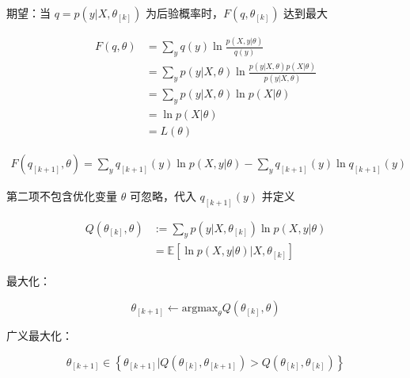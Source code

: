 \documentclass[openany,a4paper,12pt]{ctexbook}
\theoremstyle{kaiti}
\theoremstyle{normal}
\begin{document}
期望：当 $q=p\left(y|X,\theta_{\left[k \right]} \right)$ 为后验概率时，$F\left(q,\theta_{\left[k \right]} \right)$ 达到最大

\begin{equation}
\begin{aligned}
  F\left(q,\theta \right)
  &=\sum_yq(y)\ln\frac{p\left(X,y|\theta \right)}{q(y)}\\
  &=\sum_yp\left(y|X,\theta \right)\ln\frac{p\left(y|X,\theta \right)p(X|\theta)}{p\left(y|X,\theta \right)} \\
  &=\sum_yp\left(y|X,\theta \right)\ln p(X|\theta)\\
  &=\ln p(X|\theta)\\
  &=L(\theta)
\end{aligned}
\end{equation}

\begin{equation}
\begin{aligned}
  F\left(q_{\left[k+1 \right]},\theta \right)=\sum_yq_{\left[k+1 \right]}(y)\ln p\left(X,y|\theta \right)-\sum_yq_{\left[k+1 \right]}(y)\ln q_{\left[k+1 \right]}(y)
\end{aligned}
\end{equation}

第二项不包含优化变量 $\theta$ 可忽略，代入 $q_{\left[k+1 \right]}(y)$ 并定义

\begin{equation}
\begin{aligned}
  Q\left(\theta_{\left[k \right]},\theta \right)&:=\sum_yp\left(y|X,\theta_{\left[k \right]} \right)\ln p\left(X,y|\theta \right)\\
  &=\mathbb{E} \left[\ln p\left(X,y|\theta \right)|X,\theta_{\left[ k \right]} \right]
\end{aligned}
\end{equation}

最大化：

\begin{equation}
\theta_{\left[k+1 \right]}\gets \mathrm{argmax}_{\theta}Q\left(\theta_{\left[k \right]},\theta \right)
\end{equation}

广义最大化：

\begin{equation}
\theta_{\left[k+1 \right]}\in \left\{ \theta_{\left[k+1 \right]}|Q\left(\theta_{\left[k \right]},\theta_{\left[k+1 \right]} \right)>Q\left(\theta_{\left[k \right]},\theta_{\left[k \right]} \right)\right\}
\end{equation}
\end{document}
